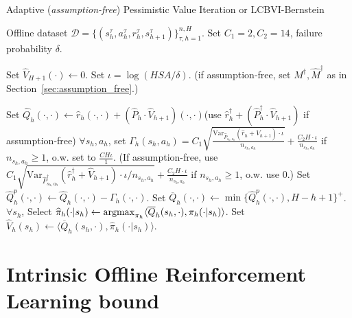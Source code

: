 \begin{algorithm}[H]
	\caption{Adaptive (\emph{assumption-free}) Pessimistic Value Iteration or LCBVI-Bernstein}
	\label{alg:APVI}
	\small{
		\begin{algorithmic}[1]
			 Offline dataset $\mathcal{D}=\{(s_h^\tau,a_h^\tau,r_h^\tau,s_{h+1}^\tau)\}_{\tau,h=1}^{n,H}$. Set $C_1=2,C_2=14$, failure probability $\delta$.
			
			 Set $\widehat{V}_{H+1}(\cdot)\leftarrow 0$.  Set $\iota=\log(HSA/\delta)$. (if assumption-free, set $M^\dagger,\widehat{M}^\dagger$ as in Section~\ref{sec:assumption_free}.)
			
			\STATE Set $\widehat{Q}_h(\cdot,\cdot)\leftarrow {\widehat{r}_h(\cdot,\cdot)}+(\widehat{P}_{h}\cdot \widehat{V}_{h+1})(\cdot,\cdot)$\;\;(use ${\widehat{r}_h^\dagger}+(\widehat{P}_{h}^\dagger\cdot \widehat{V}_{h+1})$ if assumption-free)
			\STATE $\forall s_h,a_h$, set $\Gamma_h(s_h,a_h)=C_1\sqrt{\frac{\mathrm{Var}_{\widehat{P}_{s_h,a_h}}(\widehat{r}_h+\widehat{V}_{h+1})\cdot\iota}{n_{s_h,a_h}}}+\frac{C_2H\cdot\iota}{n_{s_h,a_h}}$ if $n_{s_h,a_h}\geq 1$, o.w. set to $\frac{CH\iota}{1}$. 
			 \STATE (If assumption-free, use $C_1\sqrt{{\mathrm{Var}_{\widehat{P}^\dagger_{s_h,a_h}}(\widehat{r}^\dagger_h+\widehat{V}_{h+1})\cdot\iota}/{n_{s_h,a_h}}}+\frac{C_2H\cdot\iota}{n_{s_h,a_h}}$ if $n_{s_h,a_h}\geq 1$, o.w. use $0$.)
			\STATE Set $\widehat{Q}^p_h(\cdot,\cdot)\leftarrow \widehat{Q}_h(\cdot,\cdot)-\Gamma_h(\cdot,\cdot)$.   Set $\overline{Q}_h(\cdot,\cdot)\leftarrow \min\{\widehat{Q}^p_h(\cdot,\cdot),H-h+1\}^{+}$.
			\STATE $\forall s_h$, Select $\widehat{\pi}_h(\cdot|s_h)\leftarrow \mathop{\mathrm{argmax}}_{\pi_h}\langle \overline{Q}_h(s_h,\cdot),\pi_h(\cdot|s_h)\rangle$. Set $\widehat{V}_h(s_h)\leftarrow\langle \overline{Q}_h(s_h,\cdot), \widehat{\pi}_h(\cdot|s_h) \rangle$.
			\ENDFOR
			
			
		\end{algorithmic}
	}
\end{algorithm}

\section{Intrinsic Offline Reinforcement Learning bound}\label{sec:intrinsic}

